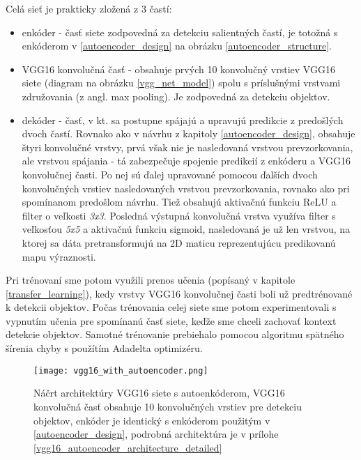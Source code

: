 Celá sieť je prakticky zložená z 3 častí:
\begin{itemize}
	\item enkóder - časť siete zodpovedná za detekciu salientných častí, je totožná s enkóderom v \ref{autoencoder_design} na obrázku \ref{autoencoder_structure}.
	\item VGG16 konvolučná časť - obsahuje prvých 10 konvolučný vrstiev VGG16 siete (diagram na obrázku \ref{vgg_net_model}) spolu s príslušnými vrstvami združovania (z angl. max pooling). Je zodpovedná za detekciu objektov. 
	\item dekóder - časť, v kt. sa postupne spájajú a upravujú predikcie z predošlých dvoch častí. Rovnako ako v návrhu z kapitoly \ref{autoencoder_design}, obsahuje štyri konvolučné vrstvy, prvá však nie je nasledovaná vrstvou prevzorkovania, ale vrstvou spájania - tá zabezpečuje spojenie predikcií z enkóderu a VGG16 konvolučnej časti. Po nej sú ďalej upravované pomocou ďalších dvoch konvolučných vrstiev nasledovaných vrstvou prevzorkovania, rovnako ako pri spomínanom predošlom návrhu. Tiež obsahujú aktivačnú funkciu ReLU a filter o veľkosti \textit{3x3}. Posledná výstupná konvolučná vrstva využíva filter s veľkosťou \textit{5x5} a aktivačnú funkciu sigmoid, nasledovaná je už len vrstvou, na ktorej sa dáta pretransformujú na 2D maticu reprezentujúcu predikovanú mapu výraznosti.
\end{itemize}

Pri trénovaní sme potom využili prenos učenia (popísaný v kapitole \ref{transfer_learning}), kedy vrstvy VGG16 konvolučnej časti boli už predtrénované k detekcii objektov. Počas trénovania celej siete sme potom experimentovali s vypnutím učenia pre spomínanú časť siete, keďže sme chceli zachovať kontext detekcie objektov. Samotné trénovanie prebiehalo pomocou algoritmu spätného šírenia chyby s použítím Adadelta optimizéru. 


\begin{figure}[H]
	\begin{center}
		\texttt{[image: vgg16\_with\_autoencoder.png]}
		\caption[Náčrt architektúry VGG16 siete s autoenkóderom]{
			Náčrt architektúry VGG16 siete s autoenkóderom, VGG16 konvolučná časť obsahuje 10 konvolučných vrstiev pre detekciu objektov, enkóder je identický s enkóderom použitým v \ref{autoencoder_design}, podrobná architektúra je v prílohe \ref{vgg16_autoencoder_architecture_detailed}
		}\label{vgg_16_with_autoencoder}
	\end{center}
\end{figure}



